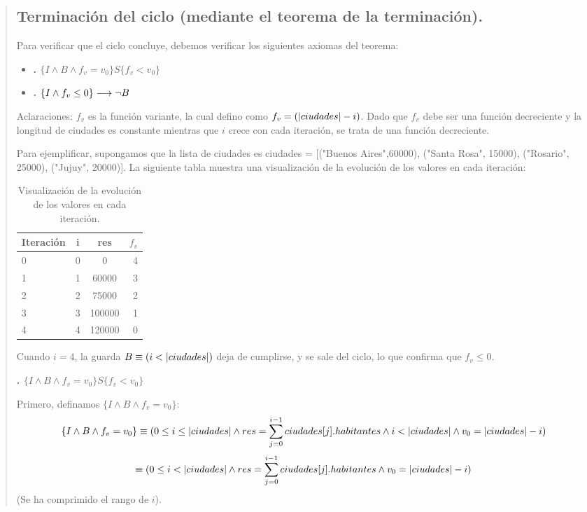 \documentclass[10pt,a4paper]{article}
\begin{document}
\begin{quote}
\subsection{Terminación del ciclo (mediante el teorema de la terminación).}

Para verificar que el ciclo concluye, debemos verificar los siguientes axiomas del teorema:
\begin{itemize}
	\item \textbf{. $\{I \land B \land f_v = v_0\} S \{f_v < v_0\}$}
	\item \textbf{. $\{I \land f_v \leq 0\} \longrightarrow \neg B$} 
\end{itemize}

Aclaraciones: $f_v$ es la función variante, la cual defino como $f_v = (|ciudades| - i)$. Dado que $f_v$ debe ser una función decreciente y la longitud de ciudades es constante mientras que $i$ crece con cada iteración, se trata de una función decreciente.

Para ejemplificar, supongamos que la lista de ciudades es ciudades = [("Buenos Aires",60000), ("Santa Rosa", 15000), ("Rosario", 25000), ("Jujuy", 20000)]. La siguiente tabla muestra una visualización de la evolución de los valores en cada iteración:

\begin{table}[h!]
	\centering
	\begin{tabular}{||l c c r||} 
		\hline
		Iteración & i & res & $f_v$ \\ [0.5ex] 
		\hline\hline
		0 & 0 & 0 & 4 \\ 
		1 & 1 & 60000 & 3 \\
		2 & 2 & 75000 & 2 \\
		3 & 3 & 100000 & 1 \\
		4 & 4 & 120000 & 0 \\
		\hline
	\end{tabular}
	\caption{Visualización de la evolución de los valores en cada iteración.}
	\label{tab:ejemplo}
\end{table}

Cuando $i = 4$, la guarda $B \equiv (i < |ciudades|)$ deja de cumplirse, y se sale del ciclo, lo que confirma que $f_v \leq 0$.

\textbf{. $\{I \land B \land f_v = v_0\} S \{f_v < v_0\}$}

Primero, definamos $\{I \land B \land f_v = v_0\}$:
\[
\{I \land B \land f_v = v_0\} \equiv (0 \leq i \leq |ciudades| \land res = \sum_{j=0}^{i-1}ciudades[j].habitantes \land i < |ciudades| \land v_0 = |ciudades| - i)
\]
\[
\equiv (0 \leq i < |ciudades| \land res = \sum_{j=0}^{i-1}ciudades[j].habitantes \land v_0 = |ciudades| - i)
\]
{(Se ha comprimido el rango de $i$).}


\end{quote}
\end{document}
